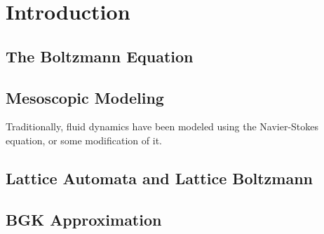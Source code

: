 \chapter{Introduction}
\section{The Boltzmann Equation}
\section{Mesoscopic Modeling}
Traditionally, fluid dynamics have been modeled using the Navier-Stokes equation, or some modification of it. 
\section{Lattice Automata and Lattice Boltzmann}
\section{BGK Approximation}
